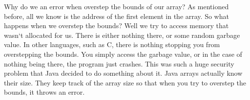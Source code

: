 \documentclass[11]{article}
\begin{document}
Why do we an error when overstep the bounds of our array? As mentioned before, all we know is the address of the first element in the array. So what happens when we overstep the bounds? Well we try to access memory that wasn`t allocated for us. There is either nothing there, or some random garbage value. In other languages, such as C, there is nothing stopping you from overstepping the bounds. You simply access the garbage value, or in the case of nothing being there, the program just crashes. This was such a huge security problem that Java decided to do something about it. Java arrays actually know their size. They keep track of the array size so that when you try to overstep the bounds, it throws an error.
\end{document}
